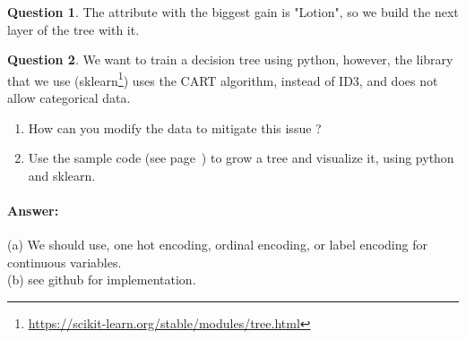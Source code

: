 \documentclass[11pt,a4paper]{article}
\theoremstyle{definition}%
\newtheorem{Q}{Question}[] %
\newcommand{\reponse}[1]{%
\ifthenelse {\boolean{corrige}} {\paragraph{Answer:} \color{darkblue}   #1\color{black}} {}
}
\begin{document}
\begin{Q}
{    The attribute with the biggest gain is "Lotion", so we build the next layer of the tree with it.

}
\end{Q}

\begin{Q}
    We want to train a decision tree using python, however, the library that we use 
    (sklearn\footnote{\url{https://scikit-learn.org/stable/modules/tree.html}}) uses
    the CART algorithm, instead of ID3, and does not allow categorical data.
    \begin{enumerate}
        \item How can you modify the data to mitigate this issue ?
        \item Use the sample code (see page~\pageref{source}) to grow a tree and visualize it, using python and sklearn.
    \end{enumerate}
    \reponse{
        (a) We should use, one hot encoding, ordinal encoding, or label encoding for continuous variables.\\
        (b) see github for implementation.
    }
\end{Q}
\end{document}
